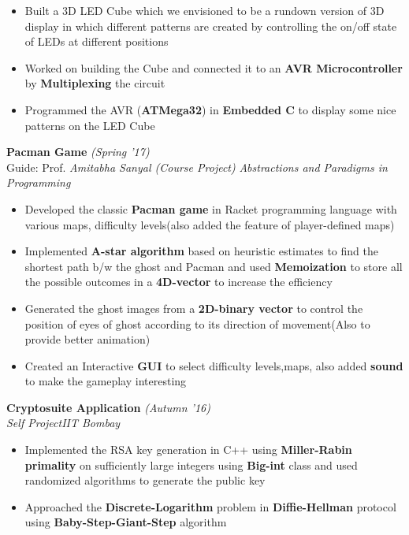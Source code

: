 \documentclass[10pt,a4paper]{article}
\begin{document}
\begin{itemize}[itemsep = -0.75 mm, leftmargin=*]
\item Built a 3D LED Cube which we envisioned to be a rundown version of 3D display in which different patterns are created by controlling the on/off state of LEDs at different positions
\item Worked on building the Cube and connected it to an \textbf{AVR Microcontroller} by \textbf{Multiplexing} the circuit
\item Programmed the AVR (\textbf{ATMega32}) in \textbf{Embedded C} to display some nice patterns on the LED Cube
\end{itemize}
\vspace{-5pt}
\textbf {Pacman Game} \hfill{\sl \small (Spring '17)}\\
Guide: Prof. \textit{Amitabha Sanyal (Course Project)}  \hfill{\sl \small Abstractions and Paradigms in Programming}\\
\vspace{-17pt}
\begin{itemize}[itemsep = -0.75 mm, leftmargin=*]
\item Developed the classic \textbf{Pacman game} in Racket programming language with various maps, difficulty levels(also added the feature of player-defined maps)
\item Implemented \textbf{A-star algorithm} based on heuristic estimates to find the shortest path b/w the ghost and Pacman and used \textbf{Memoization} to store all the possible outcomes in a \textbf{4D-vector} to increase the efficiency
\item Generated the ghost images from a \textbf{2D-binary vector} to control the position of eyes of ghost according to its direction of movement(Also to provide better animation)
\item Created an Interactive \textbf{GUI} to select difficulty levels,maps, also added \textbf{sound} to make the gameplay interesting 
\end{itemize}
\vspace{-5pt}
\textbf {Cryptosuite Application} \hfill{\sl \small (Autumn '16)}\\
\textit{Self Project}\hfill{\sl \small IIT Bombay}\\
\vspace{-17pt}
\begin{itemize}[itemsep = -0.75 mm, leftmargin=*]
\item Implemented the RSA key generation in C++ using \textbf{Miller-Rabin primality} on sufficiently large integers using \textbf{Big-int} class and used randomized algorithms to generate the public key 
\item Approached the \textbf{Discrete-Logarithm} problem in \textbf{Diffie-Hellman} protocol using \textbf{Baby-Step-Giant-Step} algorithm 
\end{itemize}
\end{document}
